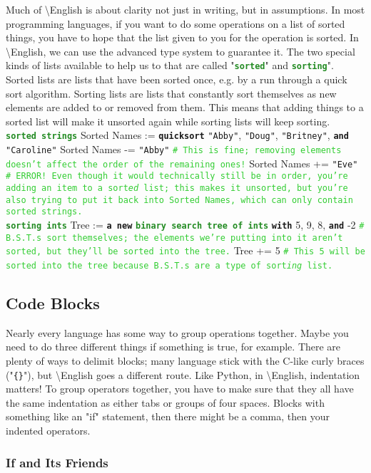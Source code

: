 \documentclass{article}
\newcommand{\English}{\textbackslash{}English}				%
\newcommand{\ssecl}[1]{\subsection{#1}\label{ssec:#1}}
\newcommand{\sssecl}[1]{\subsubsection{#1}\label{sssec:#1}}
\newcommand{\codecomment}[1]{\texttt{\textcolor{LimeGreen}{#1}}}
\newcommand{\commentline}[1]{\codecomment{\# #1}}
\newcommand{\type}[1]{\texttt{\textcolor{ForestGreen}{\textbf{#1}}}}
\newcommand{\common}[1]{\texttt{\textcolor{Mulberry}{\textbf{#1}}}}
\newcommand{\codestring}[1]{\texttt{\textcolor{NavyBlue}{"#1"}}}
\newenvironment{code}[0]
{\ttfamily{}				%
\setlength\parindent{0cm}	%
~\\}
{\setlength\parindent{1cm}
~\\}
\begin{document}
\indent Much of \English{} is about clarity not just in writing, but in assumptions. In most programming languages, if you want to do some operations on a list of sorted things, you have to hope that the list given to you for the operation is sorted. In \English{}, we can use the advanced type system to guarantee it.
\indent The two special kinds of lists available to help us to that are called "\type{sorted}" and \type{sorting}". Sorted lists are lists that have been sorted once, e.g. by a run through a quick sort algorithm. Sorting lists are lists that constantly sort themselves as new elements are added to or removed from them. This means that adding things to a sorted list will make it unsorted again while sorting lists will keep sorting.
\begin{code}
\type{sorted strings} Sorted Names := \common{quicksort} \codestring{Abby}, \codestring{Doug}, \codestring{Britney}, \common{and} \codestring{Caroline}
Sorted Names -= \codestring{Abby} \commentline{This is fine; removing elements doesn't affect the order of the remaining ones!}
Sorted Names += \codestring{Eve} \commentline{ERROR! Even though it would technically still be in order, you're adding an item to a sort\emph{ed} list; this makes it unsorted, but you're also trying to put it back into Sorted Names, which can only contain sorted strings.}\\

\type{sorting ints} Tree := \common{a new} \type{binary search tree of ints} \common{with} 5, 9, 8, \common{and} -2 \commentline{B.S.T.s sort themselves; the elements we're putting into it aren't sorted, but they'll be sorted into the tree.}
Tree += 5 \commentline{This 5 will be sorted into the tree because B.S.T.s are a type of sort\emph{ing} list.}
\end{code}

\ssecl{Code Blocks}
\indent Nearly every language has some way to group operations together. Maybe you need to do three different things if something is true, for example. There are plenty of ways to delimit blocks; many language stick with the C-like curly braces ("\texttt{\{\}}"), but \English{} goes a different route. Like Python, in \English{}, indentation matters! To group operators together, you have to make sure that they all have the same indentation as either tabs or groups of four spaces. Blocks with something like an "if" statement, then there might be a comma, then your indented operators.
\sssecl{If and Its Friends}
\end{document}
